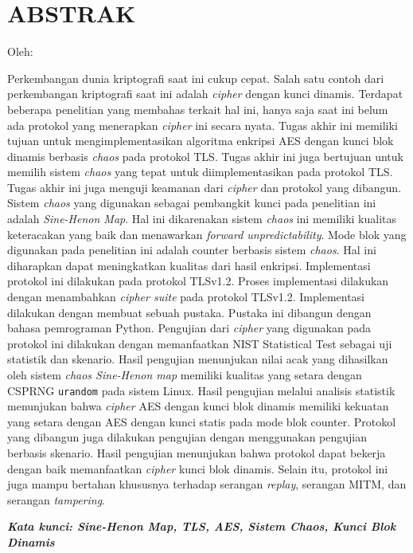 \clearpage
\chapter*{ABSTRAK}

\begin{center}
  \center
  \begin{singlespace}
    \bfseries \MakeUppercase{\thetitle}

    \normalfont\normalsize
    Oleh:
    \bfseries \theauthor
  \end{singlespace}
\end{center}


\begin{singlespace}
  Perkembangan dunia kriptografi saat ini cukup cepat. Salah satu contoh dari perkembangan kriptografi saat ini adalah \emph{cipher} dengan kunci dinamis. Terdapat beberapa penelitian yang membahas terkait hal ini, hanya saja saat ini belum ada protokol yang menerapkan \emph{cipher} ini secara nyata. Tugas akhir ini memiliki tujuan untuk mengimplementasikan algoritma enkripsi AES dengan kunci blok dinamis berbasis \emph{chaos} pada protokol TLS. Tugas akhir ini juga bertujuan untuk memilih sistem \emph{chaos} yang tepat untuk diimplementasikan pada protokol TLS. Tugas akhir ini juga menguji keamanan dari \emph{cipher} dan protokol yang dibangun. Sistem \emph{chaos} yang digunakan sebagai pembangkit kunci pada penelitian ini adalah \emph{Sine-Henon Map}. Hal ini dikarenakan sistem \emph{chaos} ini memiliki kualitas keteracakan yang baik dan menawarkan \emph{forward unpredictability}. Mode blok yang digunakan pada penelitian ini adalah counter berbasis sistem \emph{chaos}. Hal ini diharapkan dapat meningkatkan kualitas dari hasil enkripsi. Implementasi protokol ini dilakukan pada protokol TLSv1.2. Proses implementasi dilakukan dengan menambahkan \emph{cipher suite} pada protokol TLSv1.2. Implementasi dilakukan dengan membuat sebuah pustaka. Pustaka ini dibangun dengan bahasa pemrograman Python. Pengujian dari \emph{cipher} yang digunakan pada protokol ini dilakukan dengan memanfaatkan NIST Statistical Test sebagai uji statistik dan skenario. Hasil pengujian menunjukan nilai acak yang dihasilkan oleh sistem \emph{chaos Sine-Henon map} memiliki kualitas yang setara dengan CSPRNG \texttt{urandom} pada sistem Linux. Hasil pengujian melalui analisis statistik menunjukan bahwa \emph{cipher} AES dengan kunci blok dinamis memiliki kekuatan yang setara dengan AES dengan kunci statis pada mode blok counter. Protokol yang dibangun juga dilakukan pengujian dengan menggunakan pengujian berbasis skenario. Hasil pengujian menunjukan bahwa protokol dapat bekerja dengan baik memanfaatkan \emph{cipher} kunci blok dinamis. Selain itu, protokol ini juga mampu bertahan khususnya terhadap serangan \emph{replay}, serangan MITM, dan serangan \emph{tampering}.
  
  \textbf{\textit{Kata kunci: Sine-Henon Map, TLS, AES, Sistem Chaos, Kunci Blok Dinamis }}
\end{singlespace}
\clearpage
